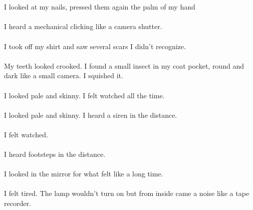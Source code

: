 \documentclass{article}
\begin{document}
    \section{}
    I looked at my nails, pressed them again the palm of my hand \\\\I heard a mechanical clicking like a camera shutter. \\\\I took off my shirt and saw several scars I didn't recognize. \\\\My teeth looked crooked. I found a small insect in my coat pocket, round and dark like a small camera. I squished it. \\\\I looked pale and skinny. I felt watched all the time. \\\\I looked pale and skinny. I heard a siren in the distance. \\\\I felt watched. \\\\I heard footsteps in the distance. \\\\I looked in the mirror for what felt like a long time. \\\\I felt tired. The lamp wouldn't turn on but from inside came a noise like a tape recorder. \\\\
    \newpage
    
\end{document}
